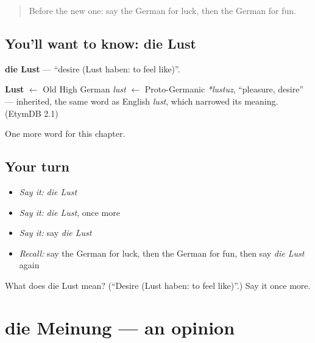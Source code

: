 \label{lesson:GE-C165-lust}



\begin{quote}
Before the new one: say the German for luck, then the German for fun.
\end{quote}

\subsection*{You'll want to know: die Lust}
\textbf{die Lust} — \textquotedblleft{}desire (Lust haben: to feel like)\textquotedblright{}.

\begin{cousinweb}
\textbf{Lust} $\leftarrow$ Old High German \emph{lust} $\leftarrow$ Proto-Germanic \emph{*lustuz}, \textquotedblleft{}pleasure, desire\textquotedblright{} — inherited, the same word as English \emph{lust}, which narrowed its meaning. (EtymDB 2.1)
\end{cousinweb}

\begin{grammarlens}[title={What you've built}]
One more word for this chapter.
\end{grammarlens}

\subsection*{Your turn}
\begin{itemize}
\raggedright
  \item \emph{Say it:} \emph{die Lust}
  \item \emph{Say it:} \emph{die Lust}, once more
  \item \emph{Say it:} say \emph{die Lust}
  \item \emph{Recall:} say the German for luck, then the German for fun, then say \emph{die Lust} again
\end{itemize}

\begin{tcolorbox}[breakable,colback=teal!4,colframe=teal!35!black,title={Before you move on}]
What does die Lust mean? (\textquotedblleft{}Desire (Lust haben: to feel like)\textquotedblright{}.) Say it once more.
\end{tcolorbox}
\section[die Meinung]{die Meinung — an opinion}

\label{lesson:GE-C165-meinung}



